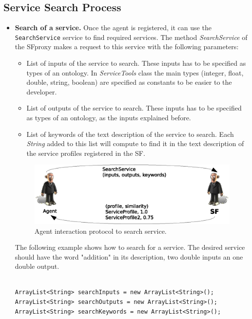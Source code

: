 \subsection{Service Search Process}
\begin{itemize}
\item \textbf{Search of a service.} Once the agent is registered, it can use the \lstinline|SearchService| service to find required services. The method \textit{SearchService} of the SFproxy makes a request to this service with the following parameters:
  \begin{itemize}
   \item List of inputs of the service to search. These inputs has to be specified as types of an ontology. In \textit{ServiceTools} class the main types (integer, float, double, string, boolean) are specified as constants to be easier to the developer.
   \item List of outputs of the service to search. These inputs has to be specified as types of an ontology, as the inputs explained before.
   \item List of keywords of the text description of the service to search. Each \textit{String} added to this list will compute to find it in the text description of the service profiles registered in the SF. 
  \end{itemize}

\begin{figure}[h!t]
	\centering
	\includegraphics[width=.8\textwidth]{Thomas/images/searchService}
	\caption{Agent interaction protocol to search service.}
\end{figure}


The following example shows how to search for a service. The desired service should have the word "addition" in its description, two double inputs an one double output.   

\begin{lstlisting}

ArrayList<String> searchInputs = new ArrayList<String>();
ArrayList<String> searchOutputs = new ArrayList<String>();
ArrayList<String> searchKeywords = new ArrayList<String>();


\end{lstlisting}
\end{itemize}
